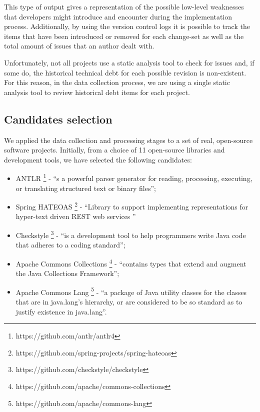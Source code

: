 \documentclass{mpaper}
\begin{document}
This type of output gives a representation of the possible low-level weaknesses
that developers might introduce and encounter during the implementation process.
Additionally, by using the version control logs it is possible to track the
items that have been introduced or removed for each change-set as well as the
total amount of issues that an author dealt with. 

Unfortunately, not all projects use a static analysis tool to check for issues
and, if some do, the historical technical debt for each possible revision is
non-existent. For this reason, in the data collection process, we are using a
single static analysis tool to review historical debt items for each project.

\subsection{Candidates selection}
\label{data-selection}

We applied the data collection and processing stages to a set of real,
open-source software projects. Initially, from a choice of 11 open-source
libraries and development tools, we have selected the following candidates: 

\begin{itemize}
	\item ANTLR \footnote{https://github.com/antlr/antlr4} - ``s a powerful parser
	      generator for reading, processing, executing, or translating structured text
	      or binary files'';
	\item Spring HATEOAS
	      \footnote{https://github.com/spring-projects/spring-hateoas} - ``Library to
	      support implementing representations for hyper-text driven REST web services
	      ''
	\item Checkstyle \footnote{https://github.com/checkstyle/checkstyle} - ``is a
	      development tool to help programmers write Java code that adheres to a coding
	      standard'';
	\item Apache Commons Collections
	      \footnote{https://github.com/apache/commons-collections} - ``contains types
	      that extend and augment the Java Collections Framework'';
	\item Apache Commons Lang \footnote{https://github.com/apache/commons-lang} -
	      ``a package of Java utility classes for the classes that are in java.lang's
	      hierarchy, or are considered to be so standard as to justify existence in
	      java.lang''.
\end{itemize}
\end{document}
